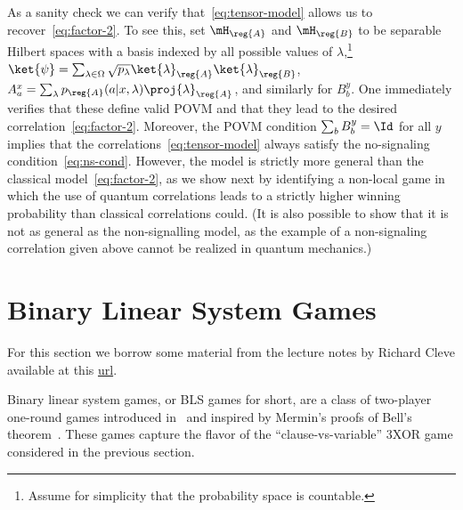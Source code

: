 As a sanity check we can verify that~\eqref{eq:tensor-model} allows us to recover~\eqref{eq:factor-2}. To see this, set $\mH_\reg{A}$ and $\mH_\reg{B}$ to be separable Hilbert spaces with a basis indexed by all possible values of $\lambda$,\footnote{Assume for simplicity that the probability space is countable.} $\ket{\psi} = \sum_{\lambda \in \Omega} \sqrt{p_\lambda} \ket{\lambda}_\reg{A} \ket{\lambda}_\reg{B}$, $A^x_a = \sum_\lambda p_\reg{A}(a|x,\lambda) \proj{\lambda}_\reg{A}$, and similarly for $B^y_b$. One immediately verifies that these define valid POVM and that they lead to the desired correlation~\eqref{eq:factor-2}. Moreover, the POVM condition $\sum_b B^y_b = \Id$ for all $y$ implies that the correlations~\eqref{eq:tensor-model} always satisfy the no-signaling condition~\eqref{eq:ns-cond}. 
 However, the model is strictly more general than the classical model~\eqref{eq:factor-2}, as we show next by identifying a non-local game in which the use of quantum correlations leads to a strictly higher winning probability than classical correlations could. (It is also possible to show that it is not as general as the non-signalling model, as the example of a non-signaling correlation given above cannot be realized in quantum mechanics.)

\section{Binary Linear System Games}

For this section we borrow some material from the lecture notes by Richard Cleve available at this \href{http://cleve.iqc.uwaterloo.ca/resources/Qic890LectureNotes2019Apr22(V22).pdf}{url}. 

\medskip

Binary linear system games, or BLS games for short, are a class of two-player one-round  games introduced in~\cite{cleve2014characterization} and inspired by Mermin's proofs of Bell's theorem~\cite{mermin1990simple,mermin1993hidden}. These games  capture the flavor of the ``clause-vs-variable'' $3$XOR game considered in the previous section. 

